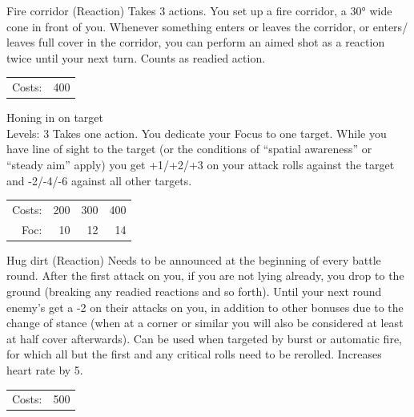 \begin{skill}{Fire corridor (Reaction)}
	\setlength{\parskip}{8pt}
	\setlength{\parindent}{0pt}
	Takes 3 actions. You set up a fire corridor, a 30° wide cone in front of you. Whenever something enters or leaves the corridor, or enters/ leaves full cover in the corridor, you can perform an aimed shot as a reaction twice until your next turn. Counts as readied action.\\

	\hfill
	\begin{tabular}{rr}
		Costs: & 400 \\
	\end{tabular}
\end{skill}

\begin{skill}{Honing in on target \\\phantom{a}\hfill Levels: 3}
	\setlength{\parskip}{8pt}
	\setlength{\parindent}{0pt}
	Takes one action. You dedicate your Focus to one target. While you have line of sight to the target (or the conditions of “spatial awareness” or “steady aim” apply) you get +1/+2/+3 on your attack rolls against the target and -2/-4/-6 against all other targets.\\

	\hfill
	\begin{tabular}{rrrr}
		Costs: & 200 & 300 & 400 \\
		Foc: & 10 & 12 & 14 \\
	\end{tabular}
\end{skill}

\begin{skill}{Hug dirt (Reaction)}
	\setlength{\parskip}{8pt}
	\setlength{\parindent}{0pt}
	Needs to be announced at the beginning of every battle round. After the first attack on you, if you are not lying already, you drop to the ground (breaking any readied reactions and so forth). Until your next round enemy’s get a -2 on their attacks on you, in addition to other bonuses due to the change of stance (when at a corner or similar you will also be considered at least at half cover afterwards). Can be used when targeted by burst or automatic fire, for which all but the first and any critical rolls need to be rerolled. Increases heart rate by 5.\\

	\hfill
	\begin{tabular}{rr}
		Costs: & 500 \\
	\end{tabular}
\end{skill}

